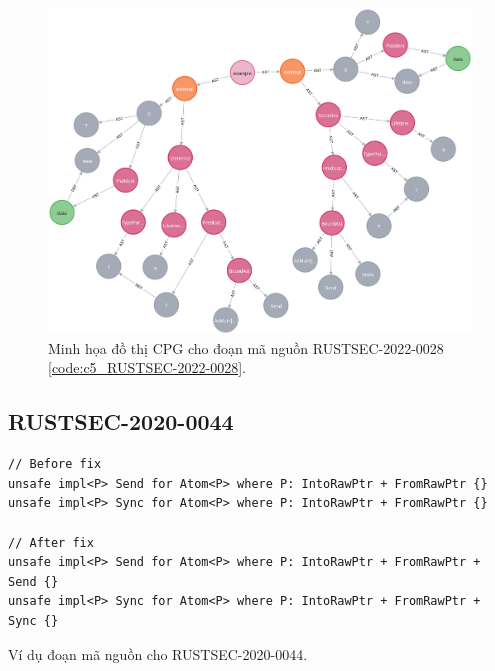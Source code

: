 


\begin{figure}[H]
    \includegraphics[width=1\columnwidth]{figures/c5/c5_RUSTSEC-2022-0028.png}
    \centering
    \caption{Minh họa đồ thị CPG cho đoạn mã nguồn RUSTSEC-2022-0028 \ref{code:c5_RUSTSEC-2022-0028}.}
    \label{img:c5_RUSTSEC-2022-0028}
\end{figure}


\subsection{RUSTSEC-2020-0044}


\begin{listing}[H]
\begin{verbatim}
// Before fix
unsafe impl<P> Send for Atom<P> where P: IntoRawPtr + FromRawPtr {}
unsafe impl<P> Sync for Atom<P> where P: IntoRawPtr + FromRawPtr {}

// After fix
unsafe impl<P> Send for Atom<P> where P: IntoRawPtr + FromRawPtr + Send {}
unsafe impl<P> Sync for Atom<P> where P: IntoRawPtr + FromRawPtr + Sync {}
\end{verbatim}
\caption{Ví dụ đoạn mã nguồn cho RUSTSEC-2020-0044.}
\label{code:c5_RUSTSEC-2020-0044}
\end{listing}

